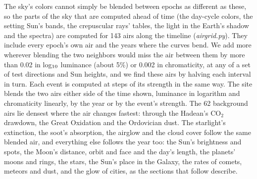 \documentclass[9pt,twocolumn]{extarticle}
\begin{document}
The sky's colors cannot simply be blended between epochs as different as these, so the parts of the sky that are computed ahead of time (the day-cycle colors, the setting Sun's bands, the crepuscular rays' tables, the light in the Earth's shadow and the spectra) are computed for 143 airs along the timeline (\emph{airgrid.py}). They include every epoch's own air and the years where the curves bend. We add more wherever blending the two neighbors would miss the air between them by more than 0.02 in log$_{\rm 10}$ luminance (about 5\%) or 0.002 in chromaticity, at any of a set of test directions and Sun heights, and we find these airs by halving each interval in turn. Each event is computed at steps of its strength in the same way. The site blends the two airs either side of the time shown, luminance in logarithm and chromaticity linearly, by the year or by the event's strength. The 62 background airs lie densest where the air changes fastest: through the Hadean's CO$_2$ drawdown, the Great Oxidation and the Ordovician dust. The starlight's extinction, the soot's absorption, the airglow and the cloud cover follow the same blended air, and everything else follows the year too: the Sun's brightness and spots, the Moon's distance, orbit and face and the day's length, the planets' moons and rings, the stars, the Sun's place in the Galaxy, the rates of comets, meteors and dust, and the glow of cities, as the sections that follow describe.
\end{document}
